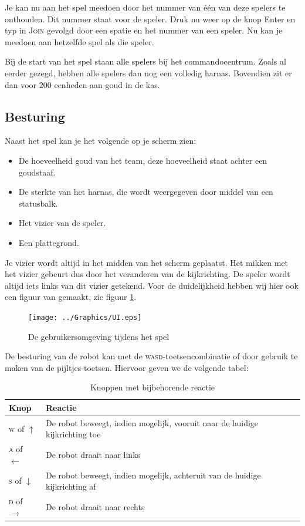 	Je kan nu aan het spel meedoen door het nummer van \'e\'en van deze spelers te onthouden. Dit nummer staat voor de speler. Druk nu weer op de knop {Enter} en typ in \textsc{Join} gevolgd door een spatie en het nummer van een speler. Nu kan je meedoen aan hetzelfde spel als die speler.
	
    Bij de start van het spel staan alle spelers bij het commandocentrum. Zoals al eerder gezegd, hebben alle spelers dan nog een volledig harnas. Bovendien zit er dan voor 200 eenheden aan goud in de kas.

    \FloatBarrier

    \subsection{Besturing}
    \label{sec:UI}

    Naast het spel kan je het volgende op je scherm zien:
    \begin{itemize}
    \item De hoeveelheid goud van het team, deze hoeveelheid staat achter een goudstaaf.
    \item De sterkte van het harnas, die wordt weergegeven door middel van een statusbalk.
    \item Het vizier van de speler.
    \item Een plattegrond.
    \end{itemize}

    Je vizier wordt altijd in het midden van het scherm geplaatst. Het mikken met het vizier gebeurt dus door het veranderen van de kijkrichting. De speler wordt altijd iets links van dit vizier getekend. Voor de duidelijkheid hebben wij hier ook een figuur van gemaakt, zie figuur \ref{fig:UI}.
    \begin{figure}
    \texttt{[image: ../Graphics/UI.eps]}
    \caption{De gebruikersomgeving tijdens het spel}
    \label{fig:UI}
    \end{figure}
    De besturing van de robot kan met de \textsc{wasd}-toetsencombinatie of door gebruik te maken van de pijltjes-toetsen. Hiervoor geven we de volgende tabel:
    \begin{table}[H]
        \small
        \centering
        \begin{tabular}{| l | l |}
        \hline
        Knop & Reactie \\ \hline
        \textsc{w} of $\uparrow$ & De robot beweegt, indien mogelijk, vooruit naar de huidige kijkrichting toe \\ \hline
        \textsc{a} of $\leftarrow$ & De robot draait naar links \\ \hline
        \textsc{s} of $\downarrow$ & De robot beweegt, indien mogelijk, achteruit van de huidige kijkrichting af \\ \hline
        \textsc{d} of $\rightarrow$ & De robot draait naar rechts \\ \hline
        \end{tabular}
        \caption{Knoppen met bijbehorende reactie}
        \label{tab:planning}
    \end{table}

